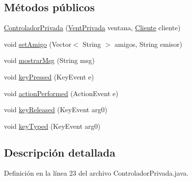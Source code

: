 \subsection*{Métodos públicos}
\begin{DoxyCompactItemize}
\item 
\hyperlink{classcom_1_1ucab_1_1javachat_1_1_cliente_1_1controller_1_1_controlador_privada_ad26e0344a4f4f5db7a6c61452eb3832d}{Controlador\-Privada} (\hyperlink{classcom_1_1ucab_1_1javachat_1_1_cliente_1_1view_1_1_vent_privada}{Vent\-Privada} ventana, \hyperlink{classcom_1_1ucab_1_1javachat_1_1_cliente_1_1model_1_1_cliente}{Cliente} cliente)
\item 
void \hyperlink{classcom_1_1ucab_1_1javachat_1_1_cliente_1_1controller_1_1_controlador_privada_ae7f5eb2e446616f188a05c98d0e42c17}{set\-Amigo} (Vector$<$ String $>$ amigos, String emisor)
\item 
void \hyperlink{classcom_1_1ucab_1_1javachat_1_1_cliente_1_1controller_1_1_controlador_privada_aad887b1c4f3509dcf6ae8059eaaa8d73}{mostrar\-Msg} (String msg)
\item 
void \hyperlink{classcom_1_1ucab_1_1javachat_1_1_cliente_1_1controller_1_1_controlador_privada_a779f6d7bee76a8eba068cb989d983158}{key\-Pressed} (Key\-Event e)
\item 
void \hyperlink{classcom_1_1ucab_1_1javachat_1_1_cliente_1_1controller_1_1_controlador_privada_aa3cecf9f9d16456b9a8443c92d6c3874}{action\-Performed} (Action\-Event e)
\item 
void \hyperlink{classcom_1_1ucab_1_1javachat_1_1_cliente_1_1controller_1_1_controlador_privada_abc820be85c010cffce5a09b3d8c7c9d2}{key\-Released} (Key\-Event arg0)
\item 
void \hyperlink{classcom_1_1ucab_1_1javachat_1_1_cliente_1_1controller_1_1_controlador_privada_a58b8267317cdb4bc3eb80031f82b5710}{key\-Typed} (Key\-Event arg0)
\end{DoxyCompactItemize}


\subsection{Descripción detallada}


Definición en la línea 23 del archivo Controlador\-Privada.\-java.




